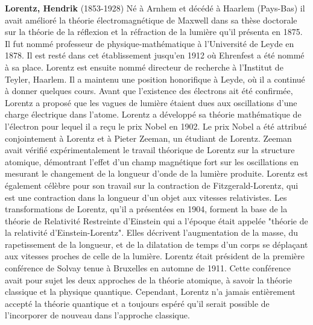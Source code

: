 \textbf{Lorentz, Hendrik} (1853-1928) Né à Arnhem et décédé à Haarlem (Pays-Bas) il avait amélioré la théorie électromagnétique de Maxwell dans sa thèse doctorale sur la théorie de la réflexion et la réfraction de la lumière qu'il présenta en 1875. Il fut nommé professeur de physique-mathématique à l'Université de Leyde en 1878. Il est resté dans cet établissement jusqu'en 1912 où Ehrenfest a été nommé à sa place. Lorentz est ensuite nommé directeur de recherche à l'Institut de Teyler, Haarlem. Il a maintenu une position honorifique à Leyde, où il a continué à donner quelques cours. Avant que l'existence des électrons ait été confirmée, Lorentz a proposé que les vagues de lumière étaient dues aux oscillations d'une charge électrique dans l'atome. Lorentz a développé sa théorie mathématique de l'électron pour lequel il a reçu le prix Nobel en 1902. Le prix Nobel a été attribué conjointement à Lorentz et à Pieter Zeeman, un étudiant de Lorentz. Zeeman avait vérifié expérimentalement le travail théorique de Lorentz sur la structure atomique, démontrant l'effet d'un champ magnétique fort sur les oscillations en mesurant le changement de la longueur d'onde de la lumière produite. Lorentz est également célèbre pour son travail sur la contraction de Fitzgerald-Lorentz, qui est une contraction dans la longueur d'un objet aux vitesses relativistes. Les transformations de Lorentz, qu'il a présentées en 1904, forment la base de la théorie de Relativité Restreinte d'Einstein qui a l'époque était appelée "théorie de la relativité d'Einstein-Lorentz". Elles décrivent l'augmentation de la masse, du rapetissement de la longueur, et de la dilatation de temps d'un corps se déplaçant aux vitesses proches de celle de la lumière. Lorentz était président de la première conférence de Solvay tenue à Bruxelles en automne de 1911. Cette conférence avait pour sujet les deux approches de la théorie atomique, à savoir la théorie classique et la physique quantique. Cependant, Lorentz n'a jamais entièrement accepté la théorie quantique et a toujours espéré qu'il serait possible de l'incorporer de nouveau dans l'approche classique.

